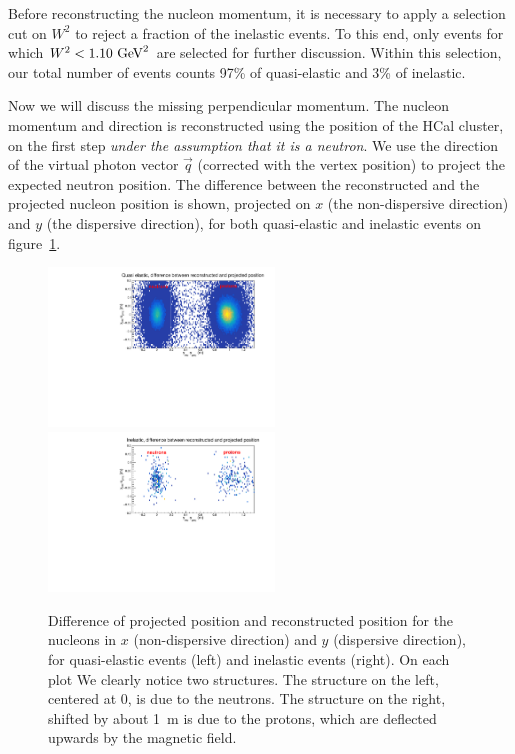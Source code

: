 Before reconstructing the nucleon momentum, it is necessary to apply a selection cut on $W^2$ to reject a fraction of the inelastic events. To this end, only events for which $W^2<1.10~{\rm GeV}^2$ are selected for further discussion. Within this selection, our total number of events counts 97\% of quasi-elastic and 3\% of inelastic.

Now we will discuss the missing perpendicular momentum.
The nucleon momentum and direction is reconstructed using the position of the HCal cluster, on the first step {\em under the assumption that it is a neutron}.
We use the direction of the virtual photon vector $\vec{q}$ (corrected with the vertex position) to project the expected neutron position.
The difference between the reconstructed and the projected nucleon position is shown, projected on $x$ (the non-dispersive direction) and $y$ (the dispersive direction), for both quasi-elastic and inelastic events on figure~\ref{hcal_id_2D}.
%
\begin{figure}[!h]
  \centering
    \includegraphics[width=6cm]{Answers_Readers/HCal_PID_QE.pdf}
    \includegraphics[width=6cm]{Answers_Readers/HCal_PID_Inel.pdf}
    \caption{Difference of projected position and reconstructed position for the nucleons in $x$ (non-dispersive direction) and $y$ (dispersive direction), for quasi-elastic events (left) and inelastic events (right). On each plot We clearly notice two structures. The structure on the left, centered at 0, is due to the neutrons. The structure on the right, shifted by about 1~m is due to the protons, which are deflected upwards by the magnetic field. 
    }
    \label{hcal_id_2D}
\end{figure}
